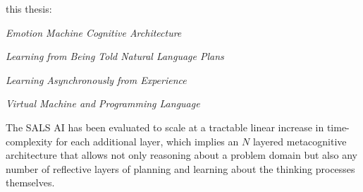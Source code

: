 this thesis:
\begin{packed_enumerate}
\item \emph{Emotion Machine Cognitive Architecture}
\item \emph{Learning from Being Told Natural Language Plans}
\item \emph{Learning Asynchronously from Experience}
\item \emph{Virtual Machine and Programming Language}
\end{packed_enumerate}
The SALS AI has been evaluated to scale at a tractable linear increase
in time-complexity for each additional layer, which implies an $N$
layered metacognitive architecture that allows not only reasoning
about a problem domain but also any number of reflective layers of
planning and learning about the thinking processes themselves.

